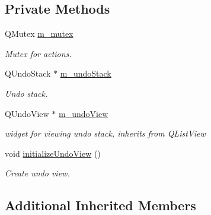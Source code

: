 \subsection*{Private Methods}
\begin{DoxyCompactItemize}
\item 
\mbox{\label{classrev_1_1_action_manager_a471d6215b5c43daaa75ce0f191aa4d7a}} 
Q\+Mutex \mbox{\hyperlink{classrev_1_1_action_manager_a471d6215b5c43daaa75ce0f191aa4d7a}{m\+\_\+mutex}}
\begin{DoxyCompactList}\small\item\em Mutex for actions. \end{DoxyCompactList}\item 
\mbox{\label{classrev_1_1_action_manager_a5f69bc6d5593624e65381f76612d4b75}} 
Q\+Undo\+Stack $\ast$ \mbox{\hyperlink{classrev_1_1_action_manager_a5f69bc6d5593624e65381f76612d4b75}{m\+\_\+undo\+Stack}}
\begin{DoxyCompactList}\small\item\em Undo stack. \end{DoxyCompactList}\item 
\mbox{\label{classrev_1_1_action_manager_a635e38273923694915b220dd918184cc}} 
Q\+Undo\+View $\ast$ \mbox{\hyperlink{classrev_1_1_action_manager_a635e38273923694915b220dd918184cc}{m\+\_\+undo\+View}}
\begin{DoxyCompactList}\small\item\em widget for viewing undo stack, inherits from Q\+List\+View \end{DoxyCompactList}\item 
\mbox{\label{classrev_1_1_action_manager_a9b32bb0adb6de7fb87114d47b0ee41c4}} 
void \mbox{\hyperlink{classrev_1_1_action_manager_a9b32bb0adb6de7fb87114d47b0ee41c4}{initialize\+Undo\+View}} ()
\begin{DoxyCompactList}\small\item\em Create undo view. \end{DoxyCompactList}\end{DoxyCompactItemize}
\subsection*{Additional Inherited Members}



